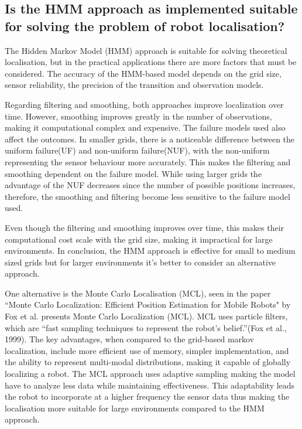 \documentclass{article}
\begin{document}
\subsection*{Is the HMM approach as implemented suitable for solving the problem of robot localisation?}
\indent

The Hidden Markov Model (HMM) approach is suitable for solving theoretical localisation, but in the practical applications there are more factors that must be considered. The accuracy of the HMM-based model depends on the grid size, sensor reliability, the precision of the transition and observation models.

Regarding filtering and smoothing, both approaches improve localization over time. However, smoothing improves greatly in the number of observations, making it computational complex and expensive. The failure models used also affect the outcomes. In smaller grids, there is a noticeable difference between the uniform failure(UF) and non-uniform failure(NUF), with the non-uniform representing the sensor behaviour more accurately. This makes the filtering and smoothing dependent on the failure model. While using larger grids the advantage of the NUF decreases since the number of possible positions increases, therefore, the smoothing and filtering become less sensitive to the failure model used.

Even though the filtering and smoothing improves over time, this makes their computational cost scale with the grid size, making it impractical for large environments. In conclusion, the HMM approach is effective for small to medium sized grids but for larger environments it's better to consider an alternative approach. 

One alternative is the Monte Carlo Localisation (MCL), seen in the paper “Monte Carlo Localization: Efficient Position Estimation for Mobile Robots" by Fox et al. presents Monte Carlo Localization (MCL). MCL uses particle filters, which are “fast sampling techniques to represent the robot’s belief.”(Fox et al., 1999). The key advantages, when compared to the grid-based markov localization, include more efficient use of memory, simpler implementation, and the ability to represent multi-modal distributions, making it capable of globally localizing a robot. The MCL approach uses adaptive sampling making the model have to analyze less data while maintaining effectiveness. This adaptability leads the robot to incorporate at a higher frequency the sensor data thus making the localisation more suitable for large environments compared to the HMM approach. 
\end{document}
